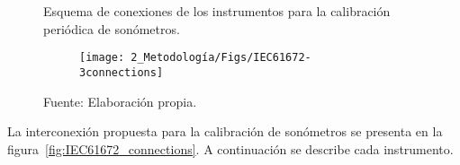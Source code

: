 \begin{figure}[!h]
    \caption{Esquema de conexiones de los instrumentos para la calibración periódica de sonómetros.}
    \label{fig:IEC61672_connections}
    \begin{subfigure}[t]{0.59\textwidth}
        \centering
        \texttt{[image: 2\_Metodología/Figs/IEC61672-3connections]}
    \end{subfigure}
    \hfill
    \begin{subfigure}[t]{0.4\textwidth}
        \centering
    \end{subfigure}
    \caption*{\footnotesize Fuente: Elaboración propia.}
\end{figure}

La interconexión propuesta para la calibración de sonómetros se presenta en la figura~\ref{fig:IEC61672_connections}.
A continuación se describe cada instrumento.
%
\clearpage

